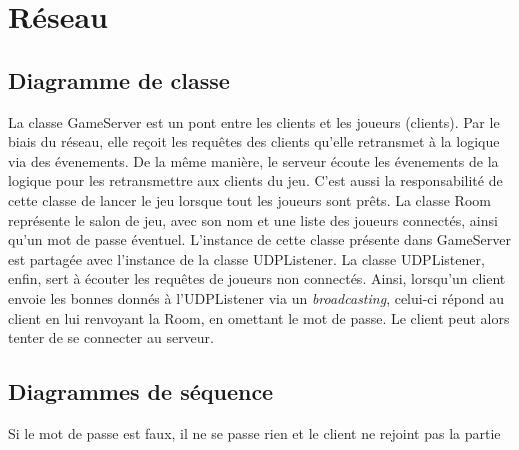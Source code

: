 \chapter{Réseau} \label{chapter:reseau}

    \section{Diagramme de classe}


        La classe GameServer est un pont entre les clients et les joueurs (clients).
        Par le biais du réseau, elle reçoit les requêtes des clients qu'elle
        retransmet à la logique via des évenements. De la même manière,
        le serveur écoute les évenements de la logique pour les retransmettre
        aux clients du jeu. C'est aussi la responsabilité de cette classe de
        lancer le jeu lorsque tout les joueurs sont prêts.
        \newline
        La classe Room représente le salon de jeu, avec son nom et une liste
        des joueurs connectés, ainsi qu'un mot de passe éventuel. L'instance
        de cette classe présente dans GameServer est partagée avec l'instance
        de la classe UDPListener.
        \newline
        La classe UDPListener, enfin, sert à écouter les requêtes de joueurs
        non connectés. Ainsi, lorsqu'un client envoie les bonnes donnés à
        l'UDPListener via un \textit{broadcasting}, celui-ci répond au client
        en lui renvoyant la Room, en omettant le mot de passe. Le client peut
        alors tenter de se connecter au serveur.

    \section{Diagrammes de séquence}

        Si le mot de passe est faux, il ne se passe rien et le client ne rejoint pas la partie

        \begin{landscape}
        \end{landscape}

